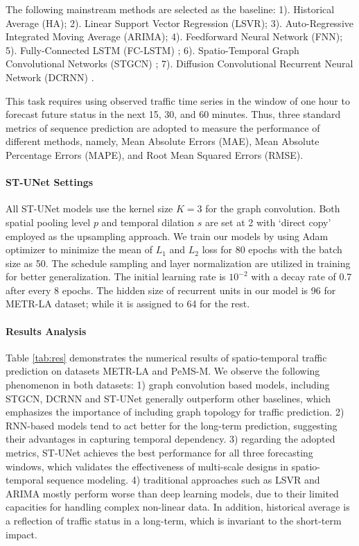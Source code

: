 \documentclass[sigconf,screen]{acmart}
\begin{document}
The following mainstream methods are selected as the baseline: 1). Historical Average (HA); 2). Linear Support Vector Regression (LSVR); 3). Auto-Regressive Integrated Moving Average (ARIMA); 4). Feedforward Neural Network (FNN); 5). Fully-Connected LSTM (FC-LSTM) \cite{sutskever2014sequence}; 6). Spatio-Temporal Graph Convolutional Networks (STGCN) \cite{yu2018spatio}; 7). Diffusion Convolutional Recurrent Neural Network (DCRNN) \cite{li2018dcrnn_traffic}.

This task requires using observed traffic time series in the window of one hour to forecast future status in the next 15, 30, and 60 minutes. Thus, three standard metrics of sequence prediction are adopted to measure the performance of different methods, namely, Mean Absolute Errors (MAE), Mean Absolute Percentage Errors (MAPE), and Root Mean Squared Errors (RMSE).

\paragraph{ST-UNet Settings}
All ST-UNet models use the kernel size $K=3$ for the graph convolution. Both spatial pooling level $p$ and temporal dilation $s$ are set at 2 with `direct copy' employed as the upsampling approach. We train our models by using Adam optimizer to minimize the mean of $L_1$ and $L_2$ loss for 80 epochs with the batch size as 50. The schedule sampling and layer normalization are utilized in training for better generalization. The initial learning rate is $10^{-2}$ with a decay rate of 0.7 after every 8 epochs. The hidden size of recurrent units in our model is 96 for METR-LA dataset; while it is assigned to 64 for the rest.

\paragraph{Results Analysis}
Table \ref{tab:res} demonstrates the numerical results of spatio-temporal traffic prediction on datasets METR-LA and PeMS-M. We observe the following phenomenon in both datasets: 1) graph convolution based models, including STGCN, DCRNN and ST-UNet generally outperform other baselines, which emphasizes the importance of including graph topology for traffic prediction. 2) RNN-based models tend to act better for the long-term prediction, suggesting their advantages in capturing temporal dependency. 3) regarding the adopted metrics, ST-UNet achieves the best performance for all three forecasting windows, which validates the effectiveness of multi-scale designs in spatio-temporal sequence modeling. 4) traditional approaches such as LSVR and ARIMA mostly perform worse than deep learning models, due to their limited capacities for handling complex non-linear data. In addition, historical average is a reflection of traffic status in a long-term, which is invariant to the short-term impact. 
\end{document}
